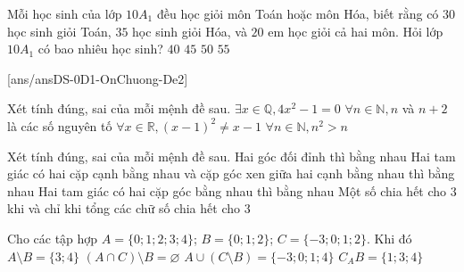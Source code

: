 %
\begin{ex}%
	Mỗi học sinh của lớp $10A_1$ đều học giỏi môn Toán hoặc môn Hóa, biết rằng có $30$ học sinh giỏi Toán, $35$ học sinh giỏi Hóa, và $20$ em học giỏi cả hai môn. Hỏi lớp $10A_1$ có bao nhiêu học sinh?
	\choice
	{$40$}
	{\True $45$}
	{$50$}
	{$55$}
\end{ex}

\TNTF
[ans/ansDS-0D1-OnChuong-De2]
%
\begin{ex}%
	Xét tính đúng, sai của mỗi mệnh đề sau.
	\choiceTF
	{\True $\exists x\in\mathbb{Q}, 4 x^2-1=0$}
	{$\forall n\in\mathbb{N}, n$ và $n+2$ là các số nguyên tố}
	{$\forall x\in\mathbb{R},(x-1)^2\neq x-1$}
	{$\forall n\in\mathbb{N}, n^2>n$}
\end{ex}
%
\begin{ex}%
	Xét tính đúng, sai của mỗi mệnh đề sau.
	\choiceTF
	{\True Hai góc đối đỉnh thì bằng nhau}
	{\True Hai tam giác có hai cặp cạnh bằng nhau và cặp góc xen giữa hai cạnh bằng nhau thì bằng nhau}
	{Hai tam giác có hai cặp góc bằng nhau thì bằng nhau}
	{\True Một số chia hết cho $3$ khi và chỉ khi tổng các chữ số chia hết cho $3$}
\end{ex}
%
\begin{ex}%
	Cho các tập hợp $A=\{0 ; 1 ; 2 ; 3 ; 4\}$; $ B=\{0 ; 1 ; 2\}$; $C=\{-3 ; 0 ; 1 ; 2\}$. Khi đó
	\choiceTF
	{\True $A\setminus B=\{3 ; 4\}$}
	{\True $(A\cap C)\setminus B=\varnothing$}
	{$A\cup (C\setminus B)=\{-3;0;1;4\}$}
	{$C_AB=\{1;3;4\}$}
\end{ex}
